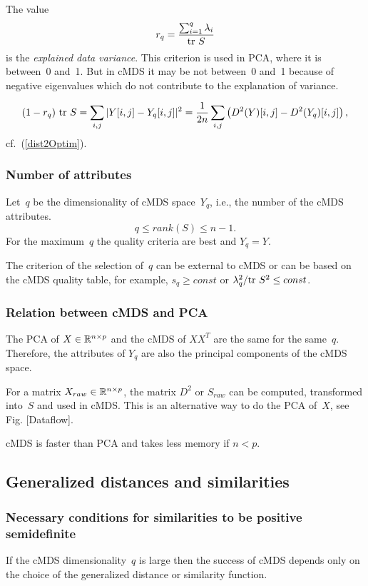 \documentclass[10pt,a4paper]{article}
\begin{document}
The value
$$ r_q = \frac {\sum_{i=1}^q \lambda_i} {\mathrm {tr} \  S} $$
is the {\em explained data variance}.
This criterion is used in PCA, where it is between~0 and~1.
But in cMDS it may be not between~0 and~1 because of negative eigenvalues which do not contribute to the explanation of variance.

$$ (1 - r_q) \ \mathrm {tr} \  S = \sum_{i,j} |Y [i,j]-Y_q [i,j]|^2 = \frac 1 {2n} \sum_{i,j} \left(D^2(Y)[i,j] - D^2(Y_q)[i,j] \right), $$
cf.~(\ref{dist2Optim}).
\comm{}


\subsubsection {Number of attributes}

Let~$q$ be the dimensionality of cMDS space~$Y_q$, i.e., the number of the cMDS attributes.
$$q \le rank(S) \le n - 1.$$
For the maximum~$q$ the quality criteria are best and $Y_q = Y$.

The criterion of the selection of~$q$ can be external to cMDS
or can be based on the cMDS quality table, for example, $s_q \ge const$ or $\lambda_q^2 / \mathrm {tr} \  S^2 \le const$.


\subsubsection {Relation between cMDS and PCA}

The PCA of $X \in \mathbb R^{n \times p}$ and the cMDS of $X X^T$ are the same for the same~$q$.
Therefore, the attributes of $Y_q$ are also the principal components of the cMDS space.

For a matrix $X_{raw} \in \mathbb R^{n \times p}$, the matrix $D^2$ or $S_{raw}$ can be computed, transformed into~$S$ and used in cMDS.
This is an alternative way to do the PCA of~$X$, see Fig. [Dataflow].

cMDS is faster than PCA and takes less memory if $n < p$.


\subsection {Generalized distances and similarities}

\subsubsection {Necessary conditions for similarities to be positive semidefinite}

If the cMDS dimensionality~$q$ is large
then the success of cMDS depends only on the choice of the generalized distance or similarity function.
\end{document}
